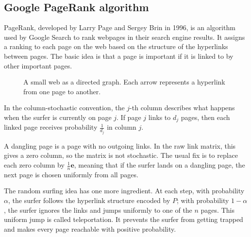 




\subsection{Google PageRank algorithm}

PageRank, developed by Larry Page and Sergey Brin in 1996, is an algorithm used by Google Search to rank webpages in their search engine results. It assigns a ranking to each page on the web based on the structure of the hyperlinks between pages. The basic idea is that a page is important if it is linked to by other important pages.

\begin{figure}[h]
\centering
{}
\caption{A small web as a directed graph. Each arrow represents a hyperlink from one page to another.}
\label{fig:pagerank-small-web}
\end{figure}

In the column-stochastic convention, the $j$-th column describes what happens when the surfer is currently on page $j$. If page $j$ links to $d_j$ pages, then each linked page receives probability $\frac{1}{d_j}$ in column $j$.

A dangling page is a page with no outgoing links. In the raw link matrix, this gives a zero column, so the matrix is not stochastic. The usual fix is to replace each zero column by $\frac{1}{n}\mathbf{e}$, meaning that if the surfer lands on a dangling page, the next page is chosen uniformly from all pages.

The random surfing idea has one more ingredient. At each step, with probability $\alpha$, the surfer follows the hyperlink structure encoded by $P$; with probability $1-\alpha$, the surfer ignores the links and jumps uniformly to one of the $n$ pages. This uniform jump is called teleportation. It prevents the surfer from getting trapped and makes every page reachable with positive probability.

